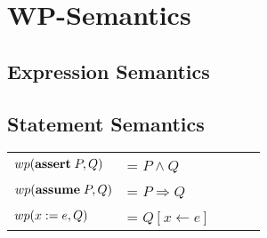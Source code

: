 \documentclass{article}
\begin{document}
\section{WP-Semantics}
	\subsection{Expression Semantics}
	\subsection{Statement Semantics}
		\begin{tabular}{lllll}
			$wp(\mathbf{assert}  \; P,Q)   $ & = $ P \land       Q$ \\
			$wp(\mathbf{assume}  \; P,Q)   $ & = $ P \Rightarrow Q$ \\
			$wp(x \; \mathbf{:=} \; e ,Q)  $ & = $ Q[x \leftarrow e]$ \\
		\end{tabular}
	
\end{document}
